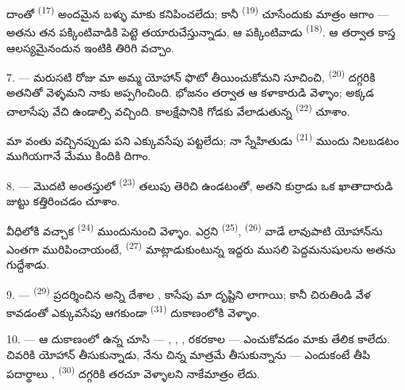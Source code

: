 దాంతో  \textsuperscript{(17)} అందమైన బళ్ళు మాకు కనిపించలేదు; కానీ
 \textsuperscript{(19)} చూసేందుకు మాత్రం ఆగాం — అతను తన
పక్కింటివాడికి పెట్టె తయారుచేస్తున్నాడు, ఆ పక్కింటివాడు
 \textsuperscript{(18)}. ఆ తర్వాత కాస్త ఆలస్యమైనందున ఇంటికి
తిరిగి వచ్చాం.

\VUsaut{3.0mm}

7. --- మరుసటి రోజు మా అమ్మ యోహాన్ ఫొటో తీయించుకోమని సూచించి, 
\textsuperscript{(20)} దగ్గరికి అతనితో వెళ్ళమని నాకు అప్పగించింది. భోజనం తర్వాత ఆ కళాకారుడి
 వెళ్ళాం; అక్కడ చాలాసేపు వేచి ఉండాల్సి వచ్చింది. కాలక్షేపానికి గోడకు
వేలాడుతున్న  \textsuperscript{(22)} చూశాం.

మా వంతు వచ్చినప్పుడు పని ఎక్కువసేపు పట్టలేదు; నా స్నేహితుడు 
\textsuperscript{(21)} ముందు నిలబడటం ముగియగానే మేము కిందికి దిగాం.

8. --- మొదటి అంతస్తులో  \textsuperscript{(23)} తలుపు తెరిచి ఉండటంతో,
అతని కుర్రాడు ఒక ఖాతాదారుడి జుట్టు కత్తిరించడం చూశాం.

వీధిలోకి వచ్చాక  \textsuperscript{(24)} ముందునుంచి వెళ్ళాం. ఎర్రని
 \textsuperscript{(25)},  \textsuperscript{(26)} వాడే లావుపాటి
 యోహాన్‌ను ఎంతగా మురిపించాయంటే, 
\textsuperscript{(27)} మాట్లాడుకుంటున్న ఇద్దరు ముసలి పెద్దమనుషులను అతను గుద్దేశాడు.

\VUsaut{3.0mm}

9. ---  \textsuperscript{(29)}  ప్రదర్శించిన
అన్ని దేశాల ,  కాసేపు మా దృష్టిని లాగాయి; కానీ చిరుతిండి వేళ
కావడంతో ఎక్కువసేపు ఆగకుండా  \textsuperscript{(31)} దుకాణంలోకి
వెళ్ళాం.

10. --- ఆ దుకాణంలో ఉన్న  చూసి — ,
, , రకరకాల  — ఎంచుకోవడం మాకు
తేలిక కాలేదు. చివరికి యోహాన్  తీసుకున్నాడు, నేను చిన్న
 మాత్రమే తీసుకున్నాను — ఎందుకంటే తీపి పదార్థాలు
,  \textsuperscript{(30)} దగ్గరికి
తరచూ వెళ్ళాలని నాకేమాత్రం లేదు.

\VUsaut{3.0mm}

